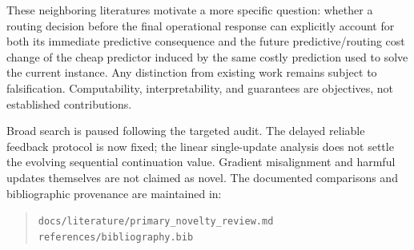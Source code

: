 These neighboring literatures motivate a more specific question: whether
a routing decision before the final operational response can explicitly
account for both its immediate predictive consequence and the future
predictive/routing cost change of the cheap predictor induced by the same costly prediction
used to solve the current instance. Any distinction from existing work
remains subject to falsification. Computability, interpretability, and
guarantees are objectives, not established contributions.

Broad search is paused following the targeted audit. The delayed reliable
feedback protocol is now fixed; the linear single-update analysis does not
settle the evolving sequential continuation value. Gradient misalignment
and harmful updates themselves are not claimed as novel.
The documented comparisons and bibliographic provenance are maintained in:
\begin{quote}
\texttt{docs/literature/primary\_novelty\_review.md}\\
\texttt{references/bibliography.bib}
\end{quote}
